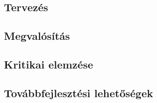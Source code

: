 \chapter{\kli}
\section{Tervezés}
\section{Megvalósítás}
\section{Kritikai elemzése}
\section{Továbbfejlesztési lehetőségek}